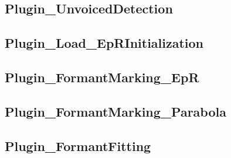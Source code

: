 \subsection{Plugin\_UnvoicedDetection}

\subsection{Plugin\_Load\_EpRInitialization}

\subsection{Plugin\_FormantMarking\_EpR}

\subsection{Plugin\_FormantMarking\_Parabola}

\subsection{Plugin\_FormantFitting}

\subsection{}

\subsection{}

